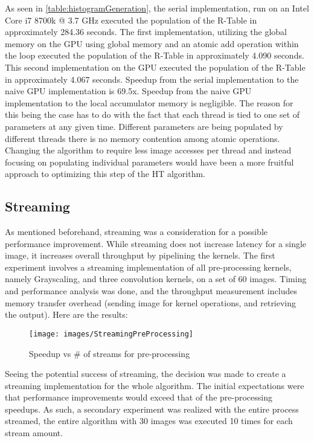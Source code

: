 \documentclass[conference]{IEEEtran}
\begin{document}
As seen in \autoref{table:histogramGeneration}, the serial implementation, run on an Intel Core i7 8700k @ 3.7 GHz executed the population of the R-Table in approximately 284.36 seconds.
The first implementation, utilizing the global memory on the GPU using global memory and an atomic add operation within the loop executed the population of the R-Table in approximately 4.090 seconds.
This second implementation on the GPU executed the population of the R-Table in approximately 4.067 seconds.
Speedup from the serial implementation to the naive GPU implementation is 69.5x.
Speedup from the naive GPU implementation to the local accumulator memory is negligible. 
The reason for this being the case has to do with the fact that each thread is tied to one set of parameters at any given time.
Different parameters are being populated by different threads there is no memory contention among atomic operations. 
Changing the algorithm to require less image accesses per thread and instead focusing on populating individual parameters would have been a more fruitful approach to optimizing this step of the HT algorithm.\label{section:histogramGeneration}


\subsection{Streaming}
As mentioned beforehand, streaming was a consideration for a possible performance improvement. While streaming does not increase latency for a single image, it increases overall throughput by pipelining the kernels. The first experiment involves a streaming implementation of all pre-processing kernels, namely Grayscaling, and three convolution kernels, on a set of 60 images. Timing and performance analysis was done, and the throughput measurement includes memory transfer overhead (sending image for kernel operations, and retrieving the output). Here are the results:
\begin{figure}[ht]
\centering
\texttt{[image: images/StreamingPreProcessing]}\caption{Speedup vs \# of streams for pre-processing}\label{figure:streamPreProcess}
\end{figure}

Seeing the potential success of streaming, the decision was made to create a streaming implementation for the whole algorithm. The initial expectations were that performance improvements would exceed that of the pre-processing speedups. As such, a secondary experiment was realized with the entire process streamed, the entire algorithm with 30 images was executed 10 times for each stream amount.
\end{document}
